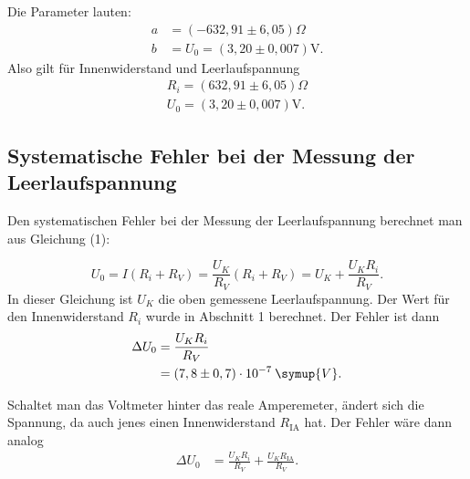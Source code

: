 \noindent Die Parameter lauten:
\begin{align*}
a &= (-632,91 \pm 6,05)\Omega \\
b &= U_0 =  (3,20 \pm 0,007)\si{\volt} .
\end{align*}
Also gilt für Innenwiderstand und Leerlaufspannung
\begin{align*}
R_i = (632,91 \pm 6,05)\Omega \\
U_0 = (3,20 \pm 0,007)\si{\volt} .
\end{align*}


\subsection{Systematische Fehler bei der Messung der Leerlaufspannung}
Den systematischen Fehler bei der Messung der Leerlaufspannung berechnet man aus Gleichung (1):

\begin{equation}
U_0 = I(R_i + R_V) = \frac{U_K}{R_V}(R_i + R_V) = U_K + \frac{U_K R_i}{R_V} .
\end{equation}
In dieser Gleichung ist $U_K$ die oben gemessene Leerlaufspannung.
Der Wert für den Innenwiderstand $R_i$ wurde in Abschnitt 1 berechnet. 
Der Fehler ist dann
\begin{align*}
\Delta U_0 &= \frac{U_K R_i}{R_V}  \\
&= (7,8 \pm 0,7) \cdot 10^{-7} \: \symup{V} .
\end{align*}

\noindent Schaltet man das Voltmeter hinter das reale Amperemeter, ändert sich die Spannung, da auch jenes einen Innenwiderstand $R_\text{IA}$ hat.
Der Fehler wäre dann analog
\begin{align*}
\Delta U_0 &= \frac{U_K R_i}{R_V}+\frac{U_K R_\text{IA}}{R_V} .  \\
\end{align*}

